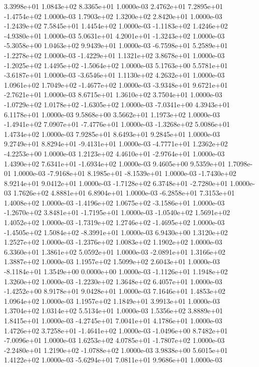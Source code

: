 3.3998e+01 1.0843e+02 8.3365e+01  1.0000e-03
 2.4762e+01  7.2895e+01 -1.4754e+02  1.0000e-03
1.7903e+02 1.3200e+02 2.8420e+01  1.0000e-03
-1.2439e+02  7.5845e+01  1.4454e+02  1.0000e-03
-1.1183e+02  1.4246e+02 -4.9380e+01  1.0000e-03
 5.0631e+01  4.2001e+01 -1.3243e+02  1.0000e-03
-5.3058e+00  1.0463e+02  9.9439e+01  1.0000e-03
-6.7598e+01  5.2589e+01 -1.2278e+02  1.0000e-03
-1.4229e+01  1.1321e+02  3.8678e+01  1.0000e-03
-1.2025e+02  1.4495e+02 -1.5064e+02  1.0000e-03
 5.1763e+00  5.5781e+01 -3.6187e+01  1.0000e-03
-3.6546e+01  1.1130e+02  4.2632e+01  1.0000e-03
 1.0961e+02  1.7049e+02 -1.4677e+02  1.0000e-03
-3.9348e+01  9.6721e+01 -2.7621e+01  1.0000e-03
8.6715e+01 1.3610e+02 3.7504e+01  1.0000e-03
-1.0729e+02  1.0178e+02 -1.6305e+02  1.0000e-03
-7.0341e+00  4.3943e+01  6.1178e+01  1.0000e-03
9.5868e+00 3.5662e+01 1.1973e+02  1.0000e-03
-1.4941e+02  7.0907e+01 -7.4776e+01  1.0000e-03
-1.3268e+02  5.0086e+01  1.4734e+02  1.0000e-03
7.9285e+01 8.6493e+01 9.2845e+01  1.0000e-03
 9.2749e+01  8.8294e+01 -9.4131e+01  1.0000e-03
-4.7771e+01  1.2362e+02 -4.2253e+00  1.0000e-03
 1.2123e+02  4.4610e+01 -2.9764e+01  1.0000e-03
 1.4390e+02  7.6341e+01 -1.6934e+02  1.0000e-03
9.4605e+00 9.5359e+01 1.7098e-01  1.0000e-03
-7.9168e+01  8.1985e+01 -8.1539e+01  1.0000e-03
-1.7430e+02  8.9214e+01  9.0412e+01  1.0000e-03
-1.7128e+02  6.3748e+01 -2.7280e+01  1.0000e-03
1.7626e+02 4.8881e+01 6.8904e+01  1.0000e-03
-6.2858e+01  7.3153e+01  1.4008e+02  1.0000e-03
-1.4196e+02  1.0675e+02 -3.1586e+01  1.0000e-03
-1.2670e+02  3.8481e+01 -1.7195e+01  1.0000e-03
-1.0540e+02  1.5691e+02  1.4052e+02  1.0000e-03
-1.7319e+02  1.2746e+02 -1.4695e+02  1.0000e-03
-1.4505e+02  1.5084e+02 -8.3991e+01  1.0000e-03
6.9430e+00 1.3120e+02 1.2527e+02  1.0000e-03
-1.2376e+02  1.0083e+02  1.1902e+02  1.0000e-03
6.3360e+01 1.3861e+02 5.0592e+01  1.0000e-03
-2.0891e+01  1.3166e+02  1.3887e+02  1.0000e-03
1.1957e+02 1.5099e+02 2.6043e+01  1.0000e-03
-8.1184e+01  1.3549e+00  0.0000e+00  1.0000e-03
-1.1126e+01  1.1948e+02  1.3260e+02  1.0000e-03
-1.2230e+02  1.3648e+02  6.4057e+01  1.0000e-03
-1.4252e+00  8.9178e+01  9.0428e+01  1.0000e-03
7.1646e+01 1.4853e+02 1.0964e+02  1.0000e-03
1.1957e+02 1.1849e+01 3.9913e+01  1.0000e-03
1.3704e+02 1.0314e+02 5.5134e+01  1.0000e-03
1.5356e+02 3.8889e+01 1.8415e+01  1.0000e-03
-4.2745e+01  7.0041e+01  4.1786e+01  1.0000e-03
 1.4726e+02  3.7258e+01 -1.4641e+02  1.0000e-03
-1.0496e+00  8.7482e+01 -7.0096e+01  1.0000e-03
 1.6253e+02  4.0785e+01 -1.7807e+02  1.0000e-03
-2.2480e+01  1.2190e+02 -1.0788e+02  1.0000e-03
3.9838e+00 5.6015e+01 1.4122e+02  1.0000e-03
-5.6294e+01  7.0811e+01  9.9686e+01  1.0000e-03
